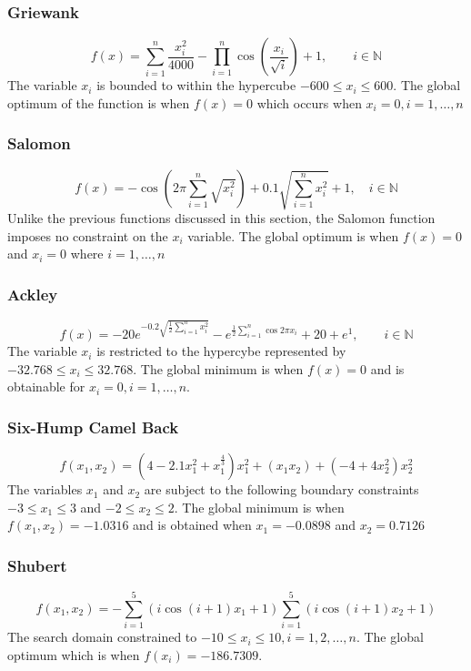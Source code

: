 \subsubsection{Griewank}
\begin{equation}
	f(x) = \sum^n_{i=1} \frac{x^2_i}{4000} - \prod^n_{i=1}\cos{(\frac{x_i}{\sqrt{i}})} + 1, \qquad i \in \mathbb{N}
\end{equation}
The variable $x_i$ is bounded to within the hypercube $ -600 \leq x_i \leq 600 $. The global optimum of the function is when $f(x) =0$ which occurs when $ x_i = 0, i = 1, \dots, n $
\subsubsection{Salomon}
\begin{equation}
	f(x) = -\cos{(2\pi\sum_{i=1}^n\sqrt{x_i^2})} + 0.1 \sqrt{\sum_{i=1}^n x_i^2} + 1, \quad i \in \mathbb{N}
\end{equation}
Unlike the previous functions discussed in this section, the Salomon function imposes no constraint on the $x_i$ variable. The global optimum is when $f(x) = 0$ and $x_i = 0$ where $i = 1,\ldots,n$
\subsubsection{Ackley}
\begin{equation}
	f(x) = -20e^{-0.2\sqrt{\frac{1}{2}\sum_{i=1}^n x_i^2}} - e^{\frac{1}{2}\sum_{i=1}^n\cos{2\pi x_i}} + 20 + e^1, \qquad i \in \mathbb{N}
\end{equation}
The variable $x_i$ is restricted to the hypercybe represented by $-32.768 \leq x_i \leq 32.768$. The global minimum is when $f(x) = 0$ and is obtainable for $x_i = 0, i = 1,\ldots,n$.
\subsubsection{Six-Hump Camel Back}
\begin{equation}
	f(x_1,x_2) = (4 - 2.1x_1^2 + x_1^{\frac{4}{3}})x_1^2 + (x_1x_2) + (-4 + 4x_2^2)x_2^2
\end{equation}
The variables $x_1$ and $x_2$ are subject to the following boundary constraints $-3 \leq x_1 \leq 3$ and $-2 \leq x_2 \leq 2$. The global minimum is when $f(x_1,x_2) = -1.0316$ and is obtained when $x_1 = -0.0898$ and $x_2 = 0.7126$
\subsubsection{Shubert}
\begin{equation}
	f(x_1,x_2) = -\sum_{i = 1}^5 (i\cos{(i +1)x_1 + 1})\sum_{i=1}^5 (i\cos{(i+1)x_2 + 1})
\end{equation}
The search domain constrained to $-10 \leq x_i \leq 10, i = 1,2, \ldots, n$. The global optimum which is when $f(x_i) = -186.7309$.
